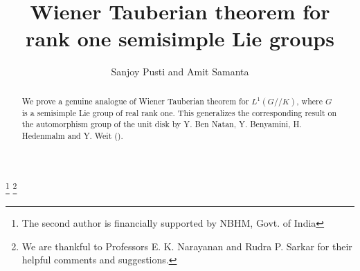 \documentclass[11pt,reqno]{amsart}
\theoremstyle{definition}
\theoremstyle{definition}
\numberwithin{equation}{section}
\begin{document}
\title{Wiener Tauberian theorem for rank one semisimple Lie groups}
 


\author{Sanjoy Pusti and Amit Samanta}

\address[Sanjoy Pusti]{Department of Mathematics and Statistics; Indian Institute of Technology, Kanpur-208016, India.}

\address[Amit Samanta]{Department of Mathematics and Statistics; Indian Institute of Technology, Kanpur-208016, India.}

\thanks{The second author is financially supported by NBHM, Govt. of India}
\thanks{We are thankful to Professors E. K. Narayanan and Rudra P. Sarkar for their helpful comments and suggestions.
}


\begin{abstract}
We prove a genuine analogue of Wiener Tauberian theorem for $L^1(G//K)$,  where $G$ is a semisimple Lie group of real rank one. This generalizes the corresponding result on the automorphism group of the unit disk by Y. Ben Natan, Y. Benyamini, H. Hedenmalm and Y. Weit (\cite{Ben-2}). 
\end{abstract}

\maketitle
\end{document}
